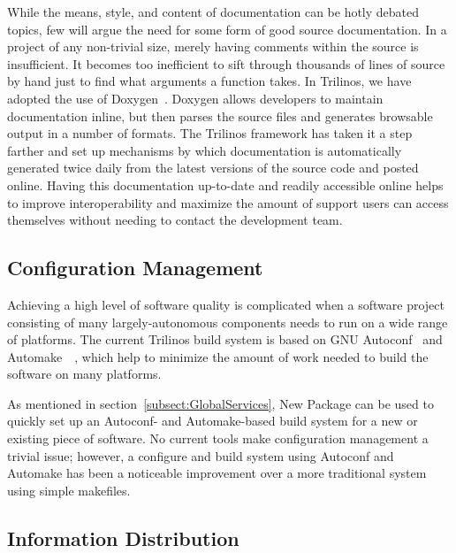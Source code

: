 \documentclass[times,10pt,twocolumn]{article}
\begin{document}
While the means, style, and content of documentation can be hotly
debated topics, few will argue the need for some form of good source
documentation. In a project of any non-trivial size, merely having
comments within the source is insufficient.  It becomes too
inefficient to sift through thousands of lines of source by hand
just to find what arguments a function takes.  In Trilinos, we have
adopted the use of Doxygen~\cite{Doxygen}.  Doxygen allows
developers to maintain documentation inline, but then parses the
source files and generates browsable output in a number of formats.
The Trilinos framework has taken it a step farther and set up
mechanisms by which documentation is automatically generated twice
daily from the latest versions of the source code and posted online.
Having this documentation up-to-date and readily accessible online
helps to improve interoperability and maximize the amount of support
users can access themselves without needing to contact the
development team.

\subsection{Configuration Management}


Achieving a high level of software quality is complicated when a
software project consisting of many largely-autonomous components
needs to run on a wide range of platforms.  The current Trilinos
build system is based on GNU Autoconf~\cite{Autoconf} and
Automake~\cite{Automake}~\cite{GoatBook}, which help to minimize the
amount of work needed to build the software on many platforms.

As mentioned in section~\ref{subsect:GlobalServices}, New Package
can be used to quickly set up an Autoconf- and Automake-based build
system for a new or existing piece of software.  No current tools
make configuration management a trivial issue; however, a configure
and build system using Autoconf and Automake has been a noticeable
improvement over a more traditional system using simple makefiles.

\subsection{Information Distribution}

\end{document}
